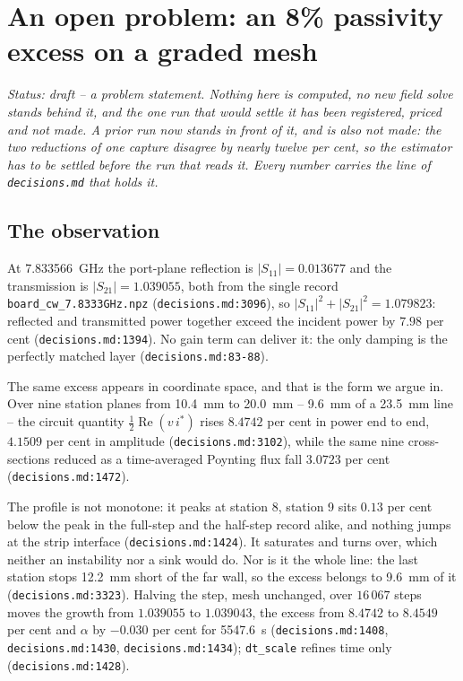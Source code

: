 \section{An open problem: an 8\% passivity excess on a graded mesh}
\label{sec:openproblem}

\noindent\emph{Status: draft -- a problem statement. Nothing here is computed, no new field solve stands behind it,
and the one run that would settle it has been registered, priced and not made. A prior run now stands in front of
it, and is also not made: the two reductions of one capture disagree by nearly twelve per cent, so the estimator
has to be settled before the run that reads it. Every number carries the line of \texttt{decisions.md} that
holds it.}

\subsection{The observation}
\label{sec:openproblem-observation}

At \SI{7.833566}{\giga\hertz} the port-plane reflection is $|S_{11}| = 0.013677$ and the transmission is
$|S_{21}| = 1.039055$, both from the single record \texttt{board\_cw\_7.8333GHz.npz}
(\texttt{decisions.md:3096}), so $|S_{11}|^2 + |S_{21}|^2 = 1.079823$: reflected and transmitted power together
exceed the incident power by $7.98$ per cent (\texttt{decisions.md:1394}). No gain term can deliver it: the only
damping is the perfectly matched layer (\texttt{decisions.md:83-88}).

The same excess appears in coordinate space, and that is the form we argue in. Over nine station planes from
\SI{10.4}{mm} to \SI{20.0}{mm} -- \SI{9.6}{mm} of a \SI{23.5}{mm} line -- the circuit quantity
$\tfrac12\operatorname{Re}(v\,i^{*})$ rises $8.4742$ per cent in power end to end, $4.1509$ per cent in amplitude
(\texttt{decisions.md:3102}), while the same nine cross-sections reduced as a time-averaged Poynting flux fall
$3.0723$ per cent (\texttt{decisions.md:1472}).

The profile is not monotone: it peaks at station 8, station 9 sits $0.13$ per cent below the peak in the full-step
and the half-step record alike, and nothing jumps at the strip interface (\texttt{decisions.md:1424}). It saturates
and turns over, which neither an instability nor a sink would do. Nor is it the whole line: the last station stops
\SI{12.2}{mm} short of the far wall, so the excess belongs to \SI{9.6}{mm} of it (\texttt{decisions.md:3323}).
Halving the step, mesh unchanged, over $16\,067$ steps moves the growth from $1.039055$ to $1.039043$, the excess
from $8.4742$ to $8.4549$ per cent and $\alpha$ by $-0.030$ per cent for \SI{5547.6}{s}
(\texttt{decisions.md:1408}, \texttt{decisions.md:1430}, \texttt{decisions.md:1434}); \texttt{dt\_scale} refines
time only (\texttt{decisions.md:1428}).

